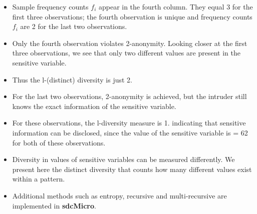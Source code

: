 \documentclass{beamer}
\begin{document}
	\begin{frame}	
		\begin{itemize}
			\item Sample frequency counts $f_i$ appear in the fourth column. They equal 3 for the ﬁrst three observations; the
			fourth observation is unique and frequency counts $f_i$ are 2 for the last two observations. 
			\item Only the fourth observation violates 2-anonymity. Looking closer at the ﬁrst
			three observations, we see that only two different values are present in the sensitive
			variable. 
			\item Thus the l-(distinct) diversity is just 2. 
		\end{itemize}
	\end{frame}
	\begin{frame}
		\begin{itemize}
			\item For the last two observations,
			2-anonymity is achieved, but the intruder still knows the exact information of the
			sensitive variable. \item For these observations, the l-diversity measure is 1. indicating
			that sensitive information can be disclosed, since the value of the sensitive variable
			is = 62 for both of these observations.
		\end{itemize}
	\end{frame}
	\begin{frame}
		\begin{itemize}
			\item Diversity in values of sensitive variables can be measured differently. We present
			here the distinct diversity that counts how many different values exist within a
			pattern. 
			\item Additional methods such as entropy, recursive and multi-recursive are implemented in \textbf{sdcMicro}.
		\end{itemize}
	\end{frame}
	
\end{document}
